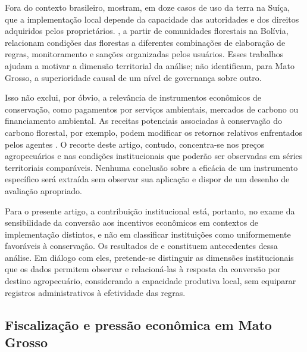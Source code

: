 Fora do contexto brasileiro,  mostram, em doze casos de uso da terra na Suíça, que a implementação local depende da capacidade das autoridades e dos direitos adquiridos pelos proprietários. , a partir de comunidades florestais na Bolívia, relacionam condições das florestas a diferentes combinações de elaboração de regras, monitoramento e sanções organizadas pelos usuários. Esses trabalhos ajudam a motivar a dimensão territorial da análise; não identificam, para Mato Grosso, a superioridade causal de um nível de governança sobre outro.

Isso não exclui, por óbvio, a relevância de instrumentos econômicos de conservação, como pagamentos por serviços ambientais, mercados de carbono ou financiamento ambiental. As receitas potenciais associadas à conservação do carbono florestal, por exemplo, podem modificar os retornos relativos enfrentados pelos agentes \cite{Angelsen2010,SticklerEtAl2013}. O recorte deste artigo, contudo, concentra-se nos preços agropecuários e nas condições institucionais que poderão ser observadas em séries territoriais comparáveis. Nenhuma conclusão sobre a eficácia de um instrumento específico será extraída sem observar sua aplicação e dispor de um desenho de avaliação apropriado.

Para o presente artigo, a contribuição institucional está, portanto, no exame da sensibilidade da conversão aos incentivos econômicos em contextos de implementação distintos, e não em classificar instituições como uniformemente favoráveis à conservação. Os resultados de  e  constituem antecedentes dessa análise. Em diálogo com eles, pretende-se distinguir as dimensões institucionais que os dados permitem observar e relacioná-las à resposta da conversão por destino agropecuário, considerando a capacidade produtiva local, sem equiparar registros administrativos à efetividade das regras.

\subsection{Fiscalização e pressão econômica em Mato Grosso}

